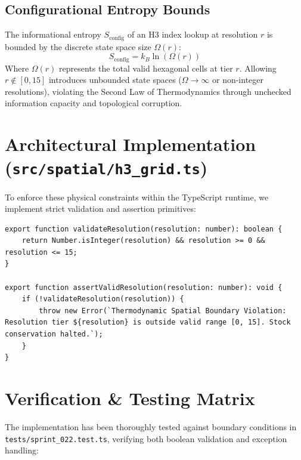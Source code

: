 \documentclass[11pt, a4paper]{article}
\begin{document}
\subsection{Configurational Entropy Bounds}
The informational entropy $S_{\text{config}}$ of an H3 index lookup at resolution $r$ is bounded by the discrete state space size $\Omega(r)$:
\begin{equation}
S_{\text{config}} = k_B \ln \left( \Omega(r) \right)
\end{equation}
Where $\Omega(r)$ represents the total valid hexagonal cells at tier $r$. Allowing $r \notin [0, 15]$ introduces unbounded state spaces ($\Omega \rightarrow \infty$ or non-integer resolutions), violating the Second Law of Thermodynamics through unchecked information capacity and topological corruption.

\section{Architectural Implementation (\texttt{src/spatial/h3\_grid.ts})}

To enforce these physical constraints within the TypeScript runtime, we implement strict validation and assertion primitives:

\begin{verbatim}
export function validateResolution(resolution: number): boolean {
    return Number.isInteger(resolution) && resolution >= 0 && resolution <= 15;
}

export function assertValidResolution(resolution: number): void {
    if (!validateResolution(resolution)) {
        throw new Error(`Thermodynamic Spatial Boundary Violation: Resolution tier ${resolution} is outside valid range [0, 15]. Stock conservation halted.`);
    }
}
\end{verbatim}

\section{Verification \& Testing Matrix}

The implementation has been thoroughly tested against boundary conditions in \texttt{tests/sprint\_022.test.ts}, verifying both boolean validation and exception handling:
\end{document}
